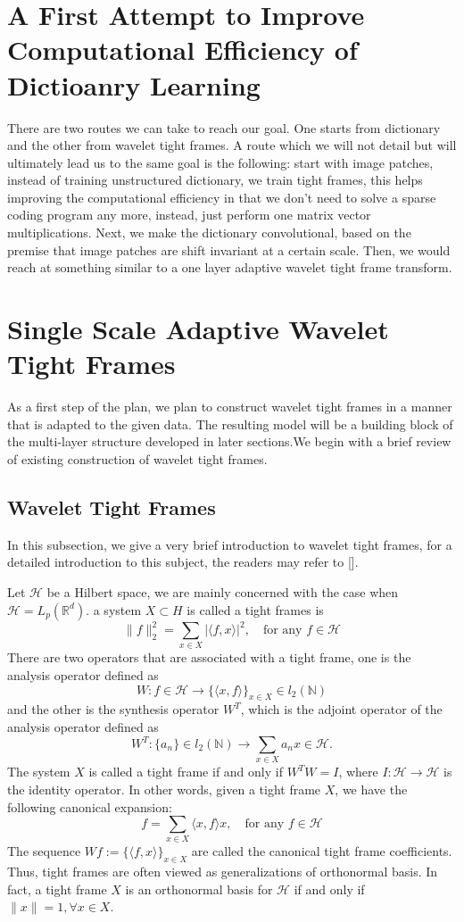 \documentclass[a4paper]{article}
\begin{document}
\section{A First Attempt to Improve Computational Efficiency of Dictioanry Learning}
There are two routes we can take to reach our goal. One starts from dictionary and the other from wavelet tight frames. A route which we will not detail but will ultimately lead us to the same goal is the following: start with image patches, instead of training unstructured dictionary, we train tight frames, this helps improving the computational efficiency in that we don't need to solve a sparse coding program any more, instead, just perform one matrix vector multiplications. Next, we make the dictionary convolutional, based on the premise that image patches are shift invariant at a certain scale. Then, we would reach at something similar to a one layer adaptive wavelet tight frame transform. 
\section{Single Scale Adaptive Wavelet Tight Frames}
As a first step of the plan, we plan to construct wavelet tight frames in a manner that is adapted to the given data. The resulting model will be a building block of the multi-layer structure developed in later sections.We begin with a brief review of existing construction of wavelet tight frames.

\subsection{Wavelet Tight Frames}
In this subsection, we give a very brief introduction to wavelet tight frames, for a detailed introduction to this subject, the readers may refer to [].

Let $\mathcal{H}$ be a Hilbert space, we are mainly concerned with the case when $\mathcal{H}=L_p(\mathbb{R}^d)$. a system $X\subset H$ is called a tight frames is
\[
	\|f\|_2^2 = \sum_{x\in X} |\langle f,x\rangle |^2, \quad \textrm{for any } f\in \mathcal{H}
\]
There are two operators that are associated with a tight frame, one is the analysis operator defined as
\[
	W: f\in \mathcal{H} \rightarrow \{\langle x,f\rangle\}_{x\in X} \in l_2(\mathbb{N})
\]
and the other is the synthesis operator $W^T$, which is the adjoint operator of the analysis operator defined as
\[
	W^T : \{a_n\} \in l_2(\mathbb{N}) \rightarrow \sum_{x\in X} a_n x\in \mathcal{H}.
\]
The system $X$ is called a tight frame if and only if $W^TW=I$, where $I: \mathcal{H} \rightarrow \mathcal{H}$ is the identity operator. In other words, given a tight frame $X$, we have the following canonical expansion:
\[
	f=\sum_{x\in X} \langle x,f\rangle x, \quad \textrm{for any } f\in \mathcal{H}
\]
The sequence $Wf:=\{\langle f,x\rangle \}_{x\in X}$ are called the canonical tight frame coefficients. Thus, tight frames are often viewed as generalizations of orthonormal basis. In fact, a tight frame $X$ is an orthonormal basis for $\mathcal{H}$ if and only if $\|x\|=1,\forall x\in X$.
\end{document}
